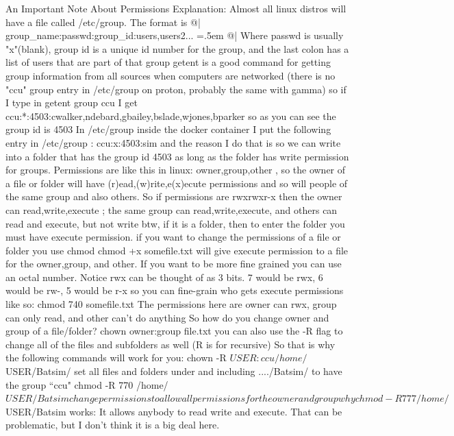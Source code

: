 \documentclass[titlepage]{article}
\newenvironment{expverbatim}
 {\SaveVerbatim{cverb}}
 {\endSaveVerbatim
  \flushleft\fboxrule=0pt\fboxsep=.5em
  \colorbox{explanation-code}{%
    \makebox[\dimexpr\linewidth-2\fboxsep][l]{\BUseVerbatim{cverb}}%
  }
  \endflushleft
}
\newcommand\infoC{\faInfoCircle}
\begin{document}
\begin{explanation}[basicstyle=\small\color{black}\ttfamily, breaklines=True]{\infoC}{An Important Note About Permissions}
Explanation:
	 Almost all linux distros will have a file called /etc/group.
	The format is
	@|
	\begin{expverbatim}
	group_name:passwd:group_id:users,users2...        
	\end{expverbatim}
	@|
	Where passwd is usually "x"(blank), group id is a unique id number for the group,
	and the last colon has a list of users that are part of that group
	getent is a good command for getting group information from all sources when computers are networked (there is no "ccu" group entry in /etc/group on proton, probably the same with gamma)
	so if I type in
	getent group ccu 
	I get
	ccu:*:4503:cwalker,ndebard,gbailey,bslade,wjones,bparker
	so as you can see the group id is 4503
	In /etc/group inside the docker container I put the following entry in /etc/group  :
	ccu:x:4503:sim
	and the reason I do that is so we can write into a folder that has the group id 4503 as long as the folder has write permission for groups.
	Permissions are like this in linux:  owner,group,other , so the owner of a file or folder will have (r)ead,(w)rite,e(x)ecute permissions and so will people of the same group and also others.
	So if permissions are    rwxrwxr-x    then the owner can read,write,execute ; the same group can read,write,execute, and others can read and execute, but not write
	btw, if it is a folder, then to enter the folder you must have execute permission.  if you want to change the permissions of a file or folder you use chmod
	chmod +x somefile.txt  will give execute permission to a file for the owner,group, and other.  If you want to be more fine grained you can use an octal number.
	Notice rwx can be thought of as 3 bits. 7 would be rwx, 6 would be rw-, 5 would be r-x
	so you can fine-grain who gets execute permissions like so:
	chmod 740 somefile.txt   The permissions here are owner can rwx, group can only read, and other can't do anything
	So how do you change owner and group of a file/folder?
	chown owner:group file.txt  you can also use the -R flag to change all of the files and subfolders as well (R is for recursive)
	So that is why the following commands will work for you:
chown -R $USER:ccu /home/$USER/Batsim/    set all files and folders under and including ..../Batsim/  to have the group ``ccu"
chmod -R 770 /home/$USER/Batsim   change permissions to allow all permissions for the owner and group
why chmod -R 777  /home/$USER/Batsim   works:
It allows anybody to read write and execute.  That can be problematic, but I don't think it is a big deal here.
\end{explanation}
\end{document}
